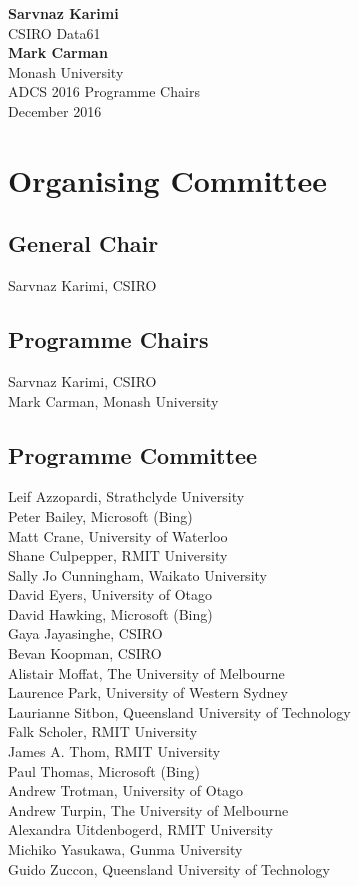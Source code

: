 \documentclass[a4paper]{article}
\begin{document}
\vspace{1cm}
\vspace{-1em}
\begin{flushright}\noindent
\textbf{Sarvnaz Karimi}\\
CSIRO Data61\\[.1in]
\textbf{Mark Carman}\\
Monash University\\[.1in]
ADCS 2016 Programme Chairs\\
December 2016
\end{flushright}

\newpage


\section*{Organising Committee}


\subsection*{General Chair}

Sarvnaz Karimi, CSIRO


\subsection*{Programme Chairs}

Sarvnaz Karimi, CSIRO\\
Mark Carman, Monash University

\subsection*{Programme Committee}
Leif Azzopardi, Strathclyde University\\
Peter Bailey, Microsoft (Bing)\\
Matt Crane, University of Waterloo \\
Shane Culpepper, RMIT University \\
Sally Jo Cunningham, Waikato University \\
David Eyers, University of Otago\\
David Hawking, Microsoft (Bing) \\
Gaya Jayasinghe, CSIRO\\
Bevan Koopman, CSIRO \\
Alistair Moffat, The University of Melbourne \\
Laurence Park, University of Western Sydney\\
Laurianne Sitbon, Queensland University of Technology\\
Falk Scholer, RMIT University \\
James A. Thom, RMIT University \\
Paul Thomas, Microsoft (Bing) \\
Andrew Trotman, University of Otago \\
Andrew Turpin, The University of Melbourne \\
Alexandra Uitdenbogerd, RMIT University\\
Michiko Yasukawa, Gunma University \\
Guido Zuccon, Queensland University of Technology
\end{document}
